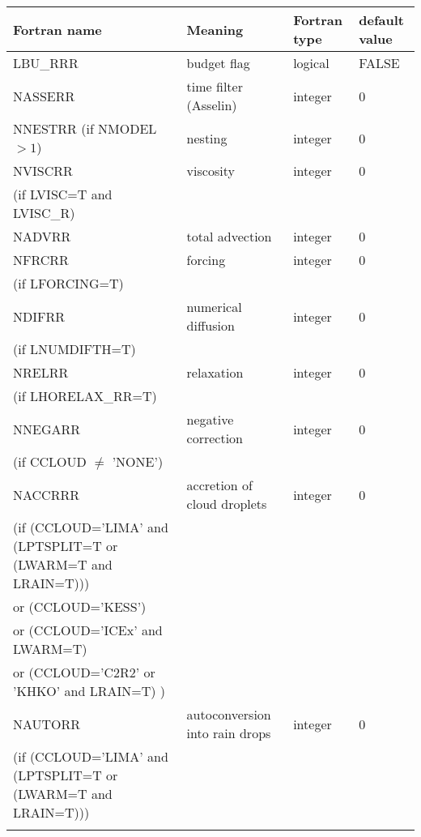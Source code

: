 \begin{longtable} {|p{}|p{}|>{\centering}p{}|p{}<{\centering}|}
\hline
Fortran name & Meaning & Fortran type & default value \\
\hline \hline
\endhead
LBU\_RRR & budget flag & logical & FALSE\index{LBU\_RRR!\innam{NAM\_BU\_RRR}} \\\hline
NASSERR  & time filter (Asselin)   & integer  &  0 \index{NASSERR!\innam{NAM\_BU\_RRR}} \\\hline
NNESTRR (if NMODEL$>1$) & nesting           & integer  &  0 \index{NNESTRR!\innam{NAM\_BU\_RRR}} \\\hline
NVISCRR  & viscosity         & integer  &  0 \index{NVISCRR!\innam{NAM\_BU\_RRR}}\\
(if LVISC=T and LVISC\_R) &  &   &   \\\hline
NADVRR   & total advection   & integer  &  0 \index{NADVRR!\innam{NAM\_BU\_RRR}}\\\hline
NFRCRR   & forcing           & integer  &  0 \index{NFRCRR!\innam{NAM\_BU\_RRR}} \\ \nopagebreak
(if LFORCING=T) &  &   &   \\\hline
NDIFRR   & numerical diffusion & integer  &  0 \index{NDIFRR!\innam{NAM\_BU\_RRR}}\\ \nopagebreak
(if LNUMDIFTH=T) &  &   &   \\\hline
NRELRR   & relaxation        & integer  &  0 \index{NRELRR!\innam{NAM\_BU\_RRR}}\\ \nopagebreak
(if LHORELAX\_RR=T) &  &   &   \\\hline
NNEGARR  & negative correction & integer  &  0 \index{NNEGARR!\innam{NAM\_BU\_RRR}}\\ \nopagebreak
(if CCLOUD $\neq$ 'NONE') & &   &  \\\hline
NACCRRR  & accretion of cloud droplets & integer  &  0 \index{NACCRRR!\innam{NAM\_BU\_RRR}}\\ \nopagebreak
(if (CCLOUD='LIMA' and (LPTSPLIT=T or (LWARM=T and LRAIN=T))) & & & \\ \nopagebreak
 or (CCLOUD='KESS') & & & \\ \nopagebreak
 or (CCLOUD='ICEx' and LWARM=T) & & & \\ \nopagebreak
 or (CCLOUD='C2R2' or 'KHKO' and LRAIN=T) ) & & & \\ \hline
NAUTORR   & autoconversion into rain drops& integer  &  0 \index{NAUTORR!\innam{NAM\_BU\_RRR}}\\ \nopagebreak
(if (CCLOUD='LIMA' and (LPTSPLIT=T or (LWARM=T and LRAIN=T))) & & & \\ \nopagebreak

\end{longtable}

